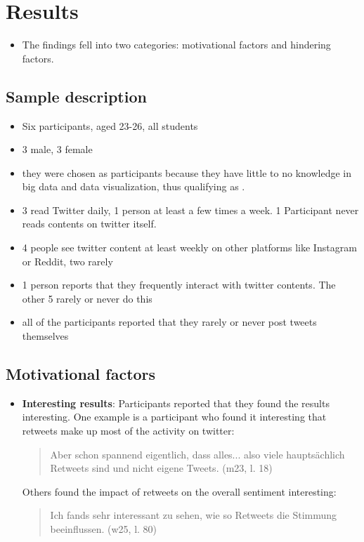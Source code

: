 \section{Results}
\begin{itemize}
    \item The findings fell into two categories: motivational factors and hindering factors.
\end{itemize}

\subsection{Sample description}
\begin{itemize}
    \item Six participants, aged 23-26, all students
    \item 3 male, 3 female
    \item they were chosen as participants because they have little to no knowledge in big data and data visualization, thus qualifying as .
    \item 3 read Twitter daily, 1 person at least a few times a week. 1 Participant never reads contents on twitter itself.
    \item 4 people see twitter content at least weekly on other platforms like Instagram or Reddit, two rarely
    \item 1 person reports that they frequently interact with twitter contents. The other 5 rarely or never do this
    \item all of the participants reported that they rarely or never post tweets themselves
\end{itemize}

\subsection{Motivational factors}
\begin{itemize}
    \item \textbf{Interesting results}: Participants reported that they found the results interesting. One example is a participant who found it interesting that retweets make up most of the activity on twitter:
    \begin{quote}
        Aber schon spannend eigentlich, dass alles... also viele hauptsächlich Retweets sind und nicht eigene Tweets. (m23, l. 18)
    \end{quote}
    Others found the impact of retweets on the overall sentiment interesting:
    \begin{quote}
        Ich fands sehr interessant zu sehen, wie so Retweets die Stimmung beeinflussen. (w25, l. 80)
    \end{quote}
\end{itemize}
